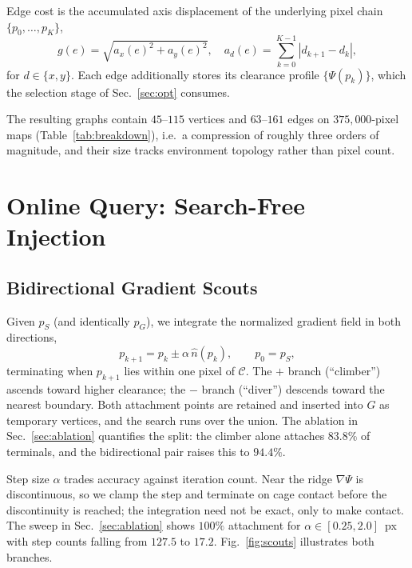 \documentclass[conference]{IEEEtran}
\begin{document}
Edge cost is the accumulated axis displacement of the underlying pixel chain $\{p_0,\dots,p_K\}$,
\begin{equation}
g(e)=\sqrt{a_x(e)^2+a_y(e)^2},\quad a_d(e)=\!\!\sum_{k=0}^{K-1}\!\!|d_{k+1}-d_k| ,
\end{equation}
for $d\in\{x,y\}$. Each edge additionally stores its clearance profile $\{\Psi(p_k)\}$, which the selection stage of Sec.~\ref{sec:opt} consumes.

The resulting graphs contain $45$--$115$ vertices and $63$--$161$ edges on $375{,}000$-pixel maps (Table~\ref{tab:breakdown}), i.e.\ a compression of roughly three orders of magnitude, and their size tracks environment topology rather than pixel count.

\section{Online Query: Search-Free Injection}
\label{sec:online}

\subsection{Bidirectional Gradient Scouts}

Given $p_S$ (and identically $p_G$), we integrate the normalized gradient field in both directions,
\begin{equation}
p_{k+1}=p_k \pm \alpha\,\hat{n}(p_k),\qquad p_0=p_S ,
\label{eq:scout}
\end{equation}
terminating when $p_{k+1}$ lies within one pixel of $\mathcal{C}$. The $+$ branch (``climber'') ascends toward higher clearance; the $-$ branch (``diver'') descends toward the nearest boundary. Both attachment points are retained and inserted into $G$ as temporary vertices, and the search runs over the union. The ablation in Sec.~\ref{sec:ablation} quantifies the split: the climber alone attaches $83.8\%$ of terminals, and the bidirectional pair raises this to $94.4\%$.

Step size $\alpha$ trades accuracy against iteration count. Near the ridge $\nabla\Psi$ is discontinuous, so we clamp the step and terminate on cage contact before the discontinuity is reached; the integration need not be exact, only to make contact. The sweep in Sec.~\ref{sec:ablation} shows $100\%$ attachment for $\alpha\in[0.25,2.0]$~px with step counts falling from $127.5$ to $17.2$. Fig.~\ref{fig:scouts} illustrates both branches.
\end{document}
